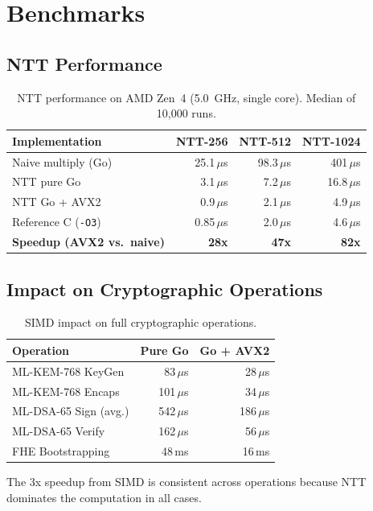 \section{Benchmarks}


\subsection{NTT Performance}

\begin{table}[H]
\centering
\small
\begin{tabular}{@{}lrrr@{}}
\toprule
\textbf{Implementation} & \textbf{NTT-256} & \textbf{NTT-512} & \textbf{NTT-1024} \\
\midrule
Naive multiply (Go) & 25.1\,$\mu$s & 98.3\,$\mu$s & 401\,$\mu$s \\
NTT pure Go & 3.1\,$\mu$s & 7.2\,$\mu$s & 16.8\,$\mu$s \\
NTT Go + AVX2 & 0.9\,$\mu$s & 2.1\,$\mu$s & 4.9\,$\mu$s \\
Reference C (\texttt{-O3}) & 0.85\,$\mu$s & 2.0\,$\mu$s & 4.6\,$\mu$s \\
\midrule
\textbf{Speedup (AVX2 vs.\ naive)} & \textbf{28x} & \textbf{47x} & \textbf{82x} \\
\bottomrule
\end{tabular}
\caption{NTT performance on AMD Zen~4 (5.0~GHz, single core). Median of 10,000 runs.}
\end{table}

\subsection{Impact on Cryptographic Operations}

\begin{table}[H]
\centering
\small
\begin{tabular}{@{}lrr@{}}
\toprule
\textbf{Operation} & \textbf{Pure Go} & \textbf{Go + AVX2} \\
\midrule
ML-KEM-768 KeyGen & 83\,$\mu$s & 28\,$\mu$s \\
ML-KEM-768 Encaps & 101\,$\mu$s & 34\,$\mu$s \\
ML-DSA-65 Sign (avg.) & 542\,$\mu$s & 186\,$\mu$s \\
ML-DSA-65 Verify & 162\,$\mu$s & 56\,$\mu$s \\
FHE Bootstrapping & 48\,ms & 16\,ms \\
\bottomrule
\end{tabular}
\caption{SIMD impact on full cryptographic operations.}
\end{table}

The 3x speedup from SIMD is consistent across operations because NTT dominates the
computation in all cases.

